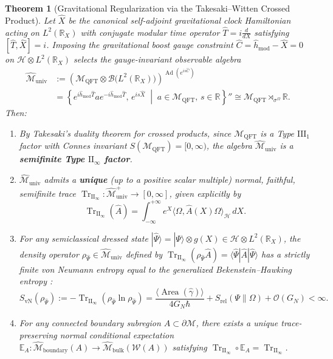 \documentclass[11pt,a4paper]{article}
\theoremstyle{plain}
\newtheorem{theorem}{Theorem}[section]
\theoremstyle{definition}
\theoremstyle{remark}
\newcommand{\TrII}{\operatorname{Tr}_{\mathrm{II}_\infty}}
\newcommand{\Area}{\operatorname{Area}}
\newcommand{\M}{\mathcal{M}}
\newcommand{\Hilb}{\mathcal{H}}
\newcommand{\W}{\mathcal{W}}
\newcommand{\R}{\mathbb{R}}
\newcommand{\Ebb}{\mathbb{E}}
\begin{document}
\begin{theorem}[Gravitational Regularization via the Takesaki--Witten Crossed Product]
\label{thm:crossed_product}
Let $\hat{X}$ be the canonical self-adjoint gravitational clock Hamiltonian acting on $L^2(\R_X)$ with conjugate modular time operator $\hat{T} = i \frac{d}{dX}$ satisfying $[\hat{T}, \hat{X}] = i$. Imposing the gravitational boost gauge constraint $\hat{C} = \hat{h}_{\mathrm{mod}} - \hat{X} = 0$ on $\Hilb \otimes L^2(\R_X)$ selects the gauge-invariant observable algebra
\begin{align}
  \widehat{\M}_{\mathrm{univ}} &:= \left( \M_{\mathrm{QFT}} \otimes \mathcal{B}\big(L^2(\R_X)\big) \right)^{\operatorname{Ad}(e^{i s \hat{C}})} \nonumber \\
  &= \left\{ e^{i \hat{h}_{\mathrm{mod}} \hat{T}} a e^{-i \hat{h}_{\mathrm{mod}} \hat{T}}, \, e^{i s \hat{X}} \;\middle|\; a \in \M_{\mathrm{QFT}}, \, s \in \R \right\}'' \cong \M_{\mathrm{QFT}} \rtimes_{\sigma^\Omega} \R.
\end{align}
Then:
\begin{enumerate}[label=(\roman*)]
  \item By Takesaki's duality theorem for crossed products, since $\M_{\mathrm{QFT}}$ is a Type $\mathrm{III}_1$ factor with Connes invariant $S(\M_{\mathrm{QFT}}) = [0,\infty)$, the algebra $\widehat{\M}_{\mathrm{univ}}$ is a \textbf{semifinite Type $\mathrm{II}_\infty$ factor}.
  \item $\widehat{\M}_{\mathrm{univ}}$ admits a \textbf{unique} (up to a positive scalar multiple) normal, faithful, semifinite trace $\TrII: \widehat{\M}_{\mathrm{univ}}^+ \to [0,\infty]$, given explicitly by
  \begin{equation}
    \label{eq:trace_II}
    \TrII(\hat{A}) = \int_{-\infty}^{+\infty} e^{X} \langle \Omega, \hat{A}(X) \Omega \rangle_{\Hilb} \, dX.
  \end{equation}
  \item For any semiclassical dressed state $|\widehat{\Psi}\rangle = |\Psi\rangle \otimes g(X) \in \Hilb \otimes L^2(\R_X)$, the density operator $\rho_{\widehat{\Psi}} \in \widehat{\M}_{\mathrm{univ}}$ defined by $\TrII(\rho_{\widehat{\Psi}} \hat{A}) = \langle \widehat{\Psi} | \hat{A} | \widehat{\Psi} \rangle$ has a strictly finite von Neumann entropy equal to the generalized Bekenstein--Hawking entropy \cite{Witten2022}:
  \begin{equation}
    S_{\mathrm{vN}}(\rho_{\widehat{\Psi}}) := -\TrII\left( \rho_{\widehat{\Psi}} \ln \rho_{\widehat{\Psi}} \right) = \frac{\langle \Area(\hat{\gamma}) \rangle}{4 G_N \hbar} + S_{\mathrm{rel}}(\Psi \| \Omega) + \mathcal{O}(G_N) < \infty.
  \end{equation}
  \item For any connected boundary subregion $A \subset \partial \M$, there exists a unique trace-preserving normal conditional expectation $\Ebb_A: \widehat{\M}_{\mathrm{boundary}}(A) \to \widehat{\M}_{\mathrm{bulk}}(\W(A))$ satisfying $\TrII \circ \Ebb_A = \TrII$.
\end{enumerate}
\end{theorem}
\end{document}
